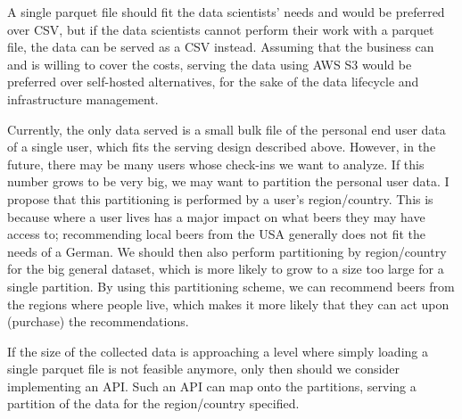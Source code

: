 \documentclass[sigconf, natbib=true]{acmart}
\begin{document}
A single parquet file should fit the data scientists' needs and would be preferred over CSV, but if the data scientists cannot perform their work with a parquet file, the data can be served as a CSV instead.
Assuming that the business can and is willing to cover the costs, serving the data using AWS S3 would be preferred over self-hosted alternatives, for the sake of the data lifecycle and infrastructure management.

Currently, the only data served is a small bulk file of the personal end user data of a single \citeauthor{untappd} user, which fits the serving design described above.
However, in the future, there may be many users whose check-ins we want to analyze.
If this number grows to be very big, we may want to partition the personal user data.
I propose that this partitioning is performed by a user's region/country.
This is because where a user lives has a major impact on what beers they may have access to; recommending local beers from the USA generally does not fit the needs of a German.
We should then also perform partitioning by region/country for the big general dataset, which is more likely to grow to a size too large for a single partition.
By using this partitioning scheme, we can recommend beers from the regions where people live, which makes it more likely that they can act upon (purchase) the recommendations.

If the size of the collected data is approaching a level where simply loading a single parquet file is not feasible anymore, only then should we consider implementing an API.
Such an API can map onto the partitions, serving a partition of the data for the region/country specified.


\def\bibfont{\small} %
 
\end{document}

